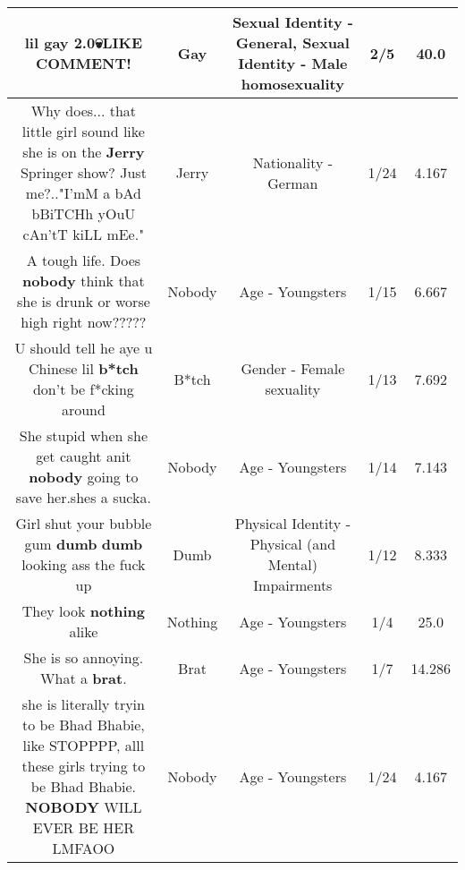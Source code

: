 \documentclass[11pt]{article}
\newlength\mylength
\begin{document}
\begin{center}
\begin{longtable}{|C{.65\mylength}|C{.30\mylength}|C{.12\mylength}|C{.12\mylength}|C{.12\mylength}|}
  \small lil \textbf{g\textbf{ay}} 2.0💀LIKE COMMENT!\normalsize   & Gay & Sexual Identity - General, Sexual Identity - Male homosexuality & 2/5 & 40.0 \\  \hline
  \small Why does... that little girl sound like she is on the \textbf{Jerry} Springer show? Just me?.."I'mM a bAd bBiTCHh yOuU cAn'tT kiLL mEe."\normalsize   & Jerry & Nationality - German & 1/24 & 4.167 \\  \hline
  \small A tough life. Does \textbf{nobody} think that she is drunk or worse high right now?????\normalsize   & Nobody & Age - Youngsters & 1/15 & 6.667 \\  \hline
  \small U should tell he aye u Chinese lil \textbf{b*tch} don't be f*cking around\normalsize   & B*tch & Gender - Female sexuality & 1/13 & 7.692 \\  \hline
  \small She stupid when she get caught anit \textbf{nobody} going to save her.shes a sucka.\normalsize   & Nobody & Age - Youngsters & 1/14 & 7.143 \\  \hline
  \small Girl shut your bubble gum \textbf{dumb} \textbf{dumb} looking ass the fuck up\normalsize   & Dumb & Physical Identity - Physical (and Mental) Impairments & 1/12 & 8.333 \\  \hline
  \small They look \textbf{nothing} alike\normalsize   & Nothing & Age - Youngsters & 1/4 & 25.0 \\  \hline
  \small She is so annoying. What a \textbf{brat}.\normalsize   & Brat & Age - Youngsters & 1/7 & 14.286 \\  \hline
  \small she is literally tryin to be Bhad Bhabie, like STOPPPP, alll these girls trying to be Bhad Bhabie. \textbf{NOBODY} WILL EVER BE HER LMFAOO\normalsize   & Nobody & Age - Youngsters & 1/24 & 4.167 \\  \hline

\end{longtable}
\end{center}
\end{document}
